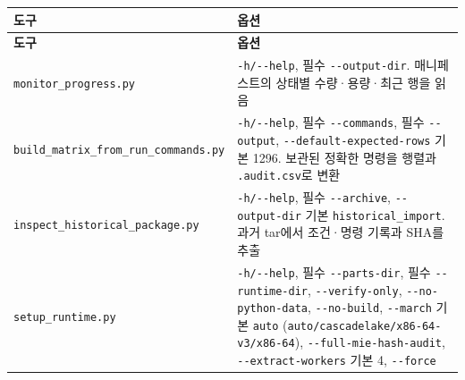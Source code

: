 {\TableFont
\begin{longtable}{@{}>{\raggedright\arraybackslash}p{}>{\raggedright\arraybackslash}p{}@{}}
\toprule
\textbf{도구} & \textbf{옵션} \\
\midrule
\endfirsthead
\toprule
\textbf{도구} & \textbf{옵션} \\
\midrule
\endhead
\bottomrule
\endfoot
\texttt{monitor\_\allowbreak{}progress.\allowbreak{}py} & \texttt{-\allowbreak{}h/\allowbreak{}-\allowbreak{}-\allowbreak{}help}, 필수 \texttt{-\allowbreak{}-\allowbreak{}output-\allowbreak{}dir}. 매니페스트의 상태별 수량·용량·최근 행을 읽음 \\
\texttt{build\_\allowbreak{}matrix\_\allowbreak{}from\_\allowbreak{}run\_\allowbreak{}commands.\allowbreak{}py} & \texttt{-\allowbreak{}h/\allowbreak{}-\allowbreak{}-\allowbreak{}help}, 필수 \texttt{-\allowbreak{}-\allowbreak{}commands}, 필수 \texttt{-\allowbreak{}-\allowbreak{}output}, \texttt{-\allowbreak{}-\allowbreak{}default-\allowbreak{}expected-\allowbreak{}rows} 기본 1296. 보관된 정확한 명령을 행렬과 \texttt{.\allowbreak{}audit.\allowbreak{}csv}로 변환 \\
\texttt{inspect\_\allowbreak{}historical\_\allowbreak{}package.\allowbreak{}py} & \texttt{-\allowbreak{}h/\allowbreak{}-\allowbreak{}-\allowbreak{}help}, 필수 \texttt{-\allowbreak{}-\allowbreak{}archive}, \texttt{-\allowbreak{}-\allowbreak{}output-\allowbreak{}dir} 기본 \texttt{historical\_\allowbreak{}import}. 과거 tar에서 조건·명령 기록과 SHA를 추출 \\
\texttt{setup\_\allowbreak{}runtime.\allowbreak{}py} & \texttt{-\allowbreak{}h/\allowbreak{}-\allowbreak{}-\allowbreak{}help}, 필수 \texttt{-\allowbreak{}-\allowbreak{}parts-\allowbreak{}dir}, 필수 \texttt{-\allowbreak{}-\allowbreak{}runtime-\allowbreak{}dir}, \texttt{-\allowbreak{}-\allowbreak{}verify-\allowbreak{}only}, \texttt{-\allowbreak{}-\allowbreak{}no-\allowbreak{}python-\allowbreak{}data}, \texttt{-\allowbreak{}-\allowbreak{}no-\allowbreak{}build}, \texttt{-\allowbreak{}-\allowbreak{}march} 기본 \texttt{auto} (\texttt{auto/\allowbreak{}cascadelake/\allowbreak{}x86-\allowbreak{}64-\allowbreak{}v3/\allowbreak{}x86-\allowbreak{}64}), \texttt{-\allowbreak{}-\allowbreak{}full-\allowbreak{}mie-\allowbreak{}hash-\allowbreak{}audit}, \texttt{-\allowbreak{}-\allowbreak{}extract-\allowbreak{}workers} 기본 4, \texttt{-\allowbreak{}-\allowbreak{}force} \\
\end{longtable}
}

